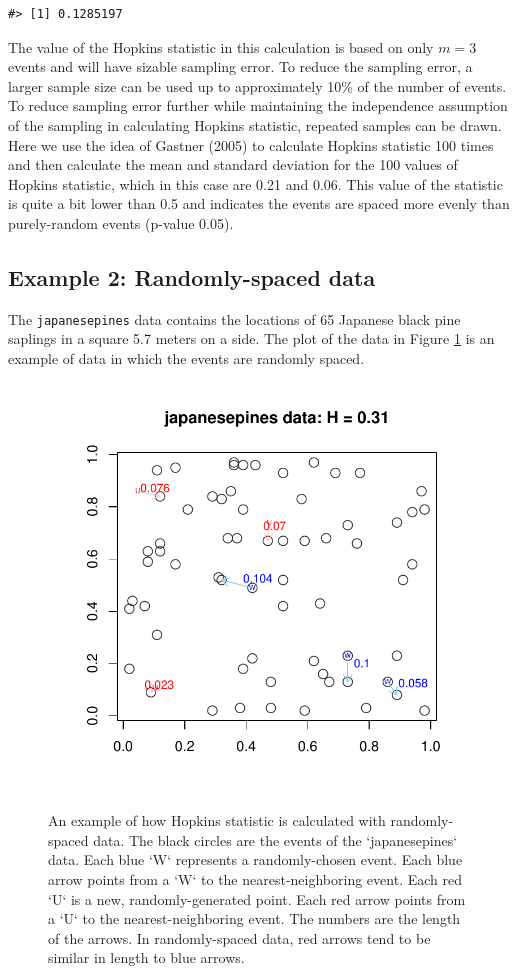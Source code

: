 \begin{verbatim}
#> [1] 0.1285197
\end{verbatim}

The value of the Hopkins statistic in this calculation is based on only \(m=3\) events and will have sizable sampling error. To reduce the sampling error, a larger sample size can be used up to approximately 10\% of the number of events. To reduce sampling error further while maintaining the independence assumption of the sampling in calculating Hopkins statistic, repeated samples can be drawn. Here we use the idea of Gastner (2005) to calculate Hopkins statistic 100 times and then calculate the mean and standard deviation for the 100 values of Hopkins statistic, which in this case are 0.21 and 0.06. This value of the statistic is quite a bit lower than 0.5 and indicates the events are spaced more evenly than purely-random events (p-value 0.05).

\hypertarget{example-2-randomly-spaced-data}{%
\subsection{Example 2: Randomly-spaced data}\label{example-2-randomly-spaced-data}}

The \texttt{japanesepines} data contains the locations of 65 Japanese black pine saplings in a square 5.7 meters on a side. The plot of the data in Figure \ref{fig:japanesepines} is an example of data in which the events are randomly spaced.

\begin{figure}

{\centering \includegraphics[width=0.6\linewidth]{hopkins_files/figure-latex/japanesepines-1} 

}

\caption{An example of how Hopkins statistic is calculated with randomly-spaced data. The black circles are the events of the `japanesepines` data. Each blue `W` represents a randomly-chosen event. Each blue arrow points from a `W` to the nearest-neighboring event. Each red `U` is a new, randomly-generated point. Each red arrow points from a `U` to the nearest-neighboring event. The numbers are the length of the arrows. In randomly-spaced data, red arrows tend to be similar in length to blue arrows.}\label{fig:japanesepines}
\end{figure}

